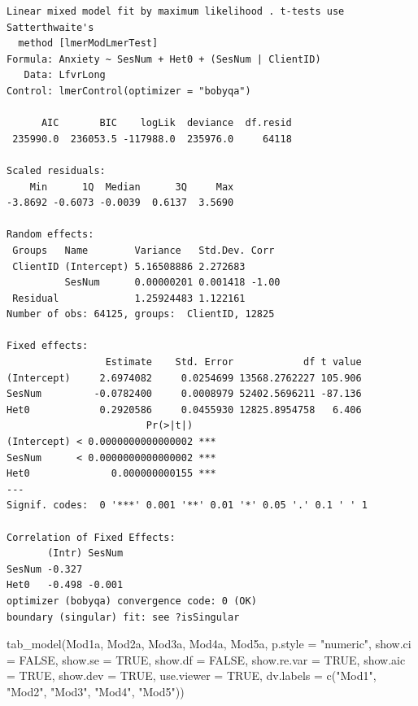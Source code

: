 \documentclass[
  english,
]{book}
\newenvironment{Shaded}{\begin{snugshade}}{\end{snugshade}}
\newcommand{\AttributeTok}[1]{\textcolor[rgb]{0.77,0.63,0.00}{#1}}
\newcommand{\ConstantTok}[1]{\textcolor[rgb]{0.00,0.00,0.00}{#1}}
\newcommand{\FunctionTok}[1]{\textcolor[rgb]{0.00,0.00,0.00}{#1}}
\newcommand{\NormalTok}[1]{#1}
\newcommand{\StringTok}[1]{\textcolor[rgb]{0.31,0.60,0.02}{#1}}
\begin{document}
\begin{verbatim}
Linear mixed model fit by maximum likelihood . t-tests use Satterthwaite's
  method [lmerModLmerTest]
Formula: Anxiety ~ SesNum + Het0 + (SesNum | ClientID)
   Data: LfvrLong
Control: lmerControl(optimizer = "bobyqa")

      AIC       BIC    logLik  deviance  df.resid 
 235990.0  236053.5 -117988.0  235976.0     64118 

Scaled residuals: 
    Min      1Q  Median      3Q     Max 
-3.8692 -0.6073 -0.0039  0.6137  3.5690 

Random effects:
 Groups   Name        Variance   Std.Dev. Corr 
 ClientID (Intercept) 5.16508886 2.272683      
          SesNum      0.00000201 0.001418 -1.00
 Residual             1.25924483 1.122161      
Number of obs: 64125, groups:  ClientID, 12825

Fixed effects:
                 Estimate    Std. Error            df t value
(Intercept)     2.6974082     0.0254699 13568.2762227 105.906
SesNum         -0.0782400     0.0008979 52402.5696211 -87.136
Het0            0.2920586     0.0455930 12825.8954758   6.406
                        Pr(>|t|)    
(Intercept) < 0.0000000000000002 ***
SesNum      < 0.0000000000000002 ***
Het0              0.000000000155 ***
---
Signif. codes:  0 '***' 0.001 '**' 0.01 '*' 0.05 '.' 0.1 ' ' 1

Correlation of Fixed Effects:
       (Intr) SesNum
SesNum -0.327       
Het0   -0.498 -0.001
optimizer (bobyqa) convergence code: 0 (OK)
boundary (singular) fit: see ?isSingular
\end{verbatim}

\begin{Shaded}
\begin{Highlighting}[]
\FunctionTok{tab\_model}\NormalTok{(Mod1a, Mod2a, Mod3a, Mod4a, Mod5a, }\AttributeTok{p.style =} \StringTok{"numeric"}\NormalTok{, }\AttributeTok{show.ci =} \ConstantTok{FALSE}\NormalTok{, }\AttributeTok{show.se =} \ConstantTok{TRUE}\NormalTok{, }\AttributeTok{show.df =} \ConstantTok{FALSE}\NormalTok{, }\AttributeTok{show.re.var =} \ConstantTok{TRUE}\NormalTok{, }\AttributeTok{show.aic =} \ConstantTok{TRUE}\NormalTok{, }\AttributeTok{show.dev =} \ConstantTok{TRUE}\NormalTok{, }\AttributeTok{use.viewer =} \ConstantTok{TRUE}\NormalTok{, }\AttributeTok{dv.labels =} \FunctionTok{c}\NormalTok{(}\StringTok{"Mod1"}\NormalTok{, }\StringTok{"Mod2"}\NormalTok{, }\StringTok{"Mod3"}\NormalTok{, }\StringTok{"Mod4"}\NormalTok{, }\StringTok{"Mod5"}\NormalTok{))}
\end{Highlighting}
\end{Shaded}
\end{document}
